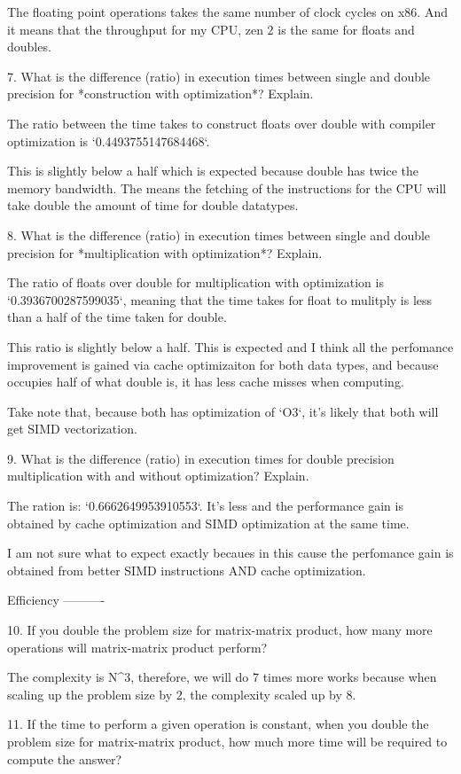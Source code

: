 \documentclass[]{article}
\begin{document}
The floating point operations takes the same number of clock cycles on x86. And it means that the throughput for my CPU, zen 2 is the same for floats and doubles.

7.  What is the difference (ratio) in execution times 
between single and double precision for    *construction with optimization*? Explain.

The ratio between the time takes to construct floats over double with compiler optimization is `0.4493755147684468`.

This is slightly below a half which is expected because double has twice the memory bandwidth. The means the fetching of the instructions for the CPU will take double the amount of time for double datatypes.

8.  What is the difference (ratio) in execution times 
between single and double precision for    *multiplication with optimization*? Explain. 

The ratio of floats over double for multiplication with optimization is `0.3936700287599035`, meaning that the time takes for float to mulitply is less than a half of the time taken for double. 

This ratio is slightly below a half. This is expected and I think all the perfomance improvement is gained via cache optimizaiton for both data types, and because occupies half of what double is, it has less cache misses when computing.

Take note that, because both has optimization of `O3`, it's likely that both will get SIMD vectorization.

9.  What is the difference (ratio) in execution times 
for double precision multiplication with and without optimization? Explain.

The ration is: `0.6662649953910553`. It's less and the performance gain is obtained by cache optimization and SIMD optimization at the same time. 

I am not sure what to expect exactly becaues in this cause the perfomance gain is obtained from better SIMD instructions AND cache optimization.

Efficiency
----------

10.  If you double the problem size for matrix-matrix product, how many more operations will matrix-matrix product perform?

The complexity is N^3, therefore, we will do 7 times more works because when scaling up the problem size by 2, the complexity scaled up by 8. 

11.  If the time to perform a given operation is constant, when you double the problem size for matrix-matrix product, how much more time will be required to compute the answer?
\end{document}
